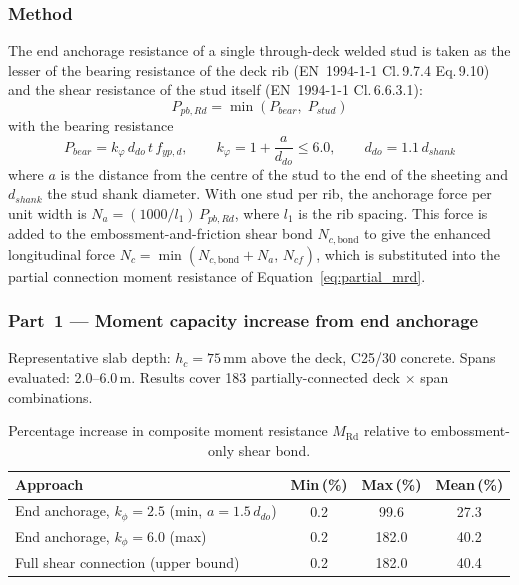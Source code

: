 \subsubsection*{Method}
The end anchorage resistance of a single through-deck welded stud is taken as the lesser of the bearing resistance of the deck rib (EN~1994-1-1 Cl.\,9.7.4 Eq.\,9.10) and the shear resistance of the stud itself (EN~1994-1-1 Cl.\,6.6.3.1):
\begin{equation}
    P_{pb,Rd} = \min\!\left( P_{bear},\; P_{stud} \right)
    \label{eq:anchorage_min}
\end{equation}
with the bearing resistance
\begin{equation}
    P_{bear} = k_\varphi\, d_{do}\, t\, f_{yp,d}, \qquad
    k_\varphi = 1 + \frac{a}{d_{do}} \le 6.0, \qquad
    d_{do} = 1.1\, d_{shank}
    \label{eq:anchorage_bear}
\end{equation}
where $a$ is the distance from the centre of the stud to the end of the sheeting and $d_{shank}$ the stud shank diameter. With one stud per rib, the anchorage force per unit width is $N_a = (1000/l_1)\,P_{pb,Rd}$, where $l_1$ is the rib spacing. This force is added to the embossment-and-friction shear bond $N_{c,\mathrm{bond}}$ to give the enhanced longitudinal force $N_c = \min(N_{c,\mathrm{bond}} + N_a,\, N_{cf})$, which is substituted into the partial connection moment resistance of Equation~\eqref{eq:partial_mrd}.

\subsubsection*{Part~1 --- Moment capacity increase from end anchorage}

Representative slab depth: $h_c = 75$\,mm above the deck, C25/30 concrete. Spans evaluated: 2.0--6.0\,m. Results cover 183 partially-connected deck$\,\times\,$span combinations.

\begin{table}[h!]
\centering\small
\caption{Percentage increase in composite moment resistance $M_\mathrm{Rd}$ relative to embossment-only shear bond.}
\label{tab:ea_summary}
\begin{tabular}{lccc}
\toprule
Approach & Min\,(\%) & Max\,(\%) & Mean\,(\%) \\
\midrule
End anchorage, $k_\phi = 2.5$ (min, $a = 1.5\,d_{do}$) & 0.2 & 99.6 & 27.3 \\
End anchorage, $k_\phi = 6.0$ (max) & 0.2 & 182.0 & 40.2 \\
Full shear connection (upper bound) & 0.2 & 182.0 & 40.4 \\
\bottomrule
\end{tabular}
\end{table}

